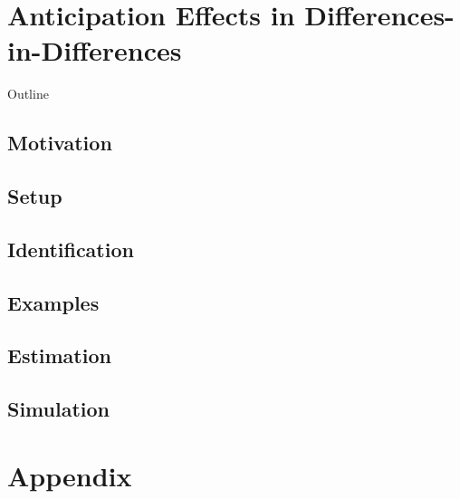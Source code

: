 \documentclass[aspectratio=1610, 9pt]{beamer}
\begin{document}
\section{Anticipation Effects in Differences-in-Differences}
\begin{frame}{Outline}
    \tableofcontents[sectionstyle=show/shaded]
\end{frame}


\subsection*{Motivation}
\subsection*{Setup}
\subsection*{Identification}
\subsection*{Examples}
\subsection*{Estimation}
\subsection*{Simulation}




\appendix
\section{Appendix}
\end{document}
